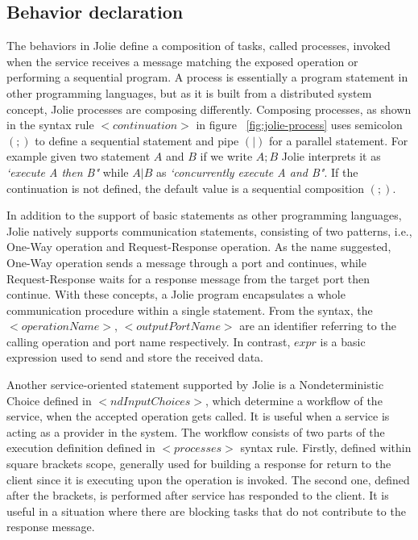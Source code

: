 \subsection{Behavior declaration}
\label{sec:jolie-behavior}

The behaviors in Jolie define a composition of tasks, called processes, invoked when the service receives a message matching the exposed operation or performing a sequential program. A process is essentially a program statement in other programming languages, but as it is built from a distributed system concept, Jolie processes are composing differently. Composing processes, as shown in the syntax rule \(<continuation>\) in figure ~\ref{fig:jolie-process}  uses semicolon \((;)\) to define a sequential statement and pipe \((|)\) for a parallel statement. For example given two statement \(A\) and \(B\) if we write \(A ; B\) Jolie interprets it as \textit{`execute A then B"} while \(A | B\) as \textit{`concurrently execute A and B"}. If the continuation is not defined, the default value is a sequential composition \((;)\).

In addition to the support of basic statements as other programming languages, Jolie natively supports communication statements, consisting of two patterns, i.e., One-Way operation and Request-Response operation. As the name suggested, One-Way operation sends a message through a port and continues, while Request-Response waits for a response message from the target port then continue. With these concepts, a Jolie program encapsulates a whole communication procedure within a single statement. From the syntax, the \(<operationName>\), \(<outputPortName>\) are an identifier referring to the calling operation and port name respectively. In contrast, \(expr\) is a basic expression used to send and store the received data.

Another service-oriented statement supported by Jolie is a Nondeterministic Choice defined in \(<ndInputChoices>\), which determine a workflow of the service, when the accepted operation gets called. It is useful when a service is acting as a provider in the system. The workflow consists of two parts of the execution definition defined in \(<processes>\) syntax rule. Firstly, defined within square brackets scope, generally used for building a response for return to the client since it is executing upon the operation is invoked. The second one, defined after the brackets, is performed after service has responded to the client. It is useful in a situation where there are blocking tasks that do not contribute to the response message.

